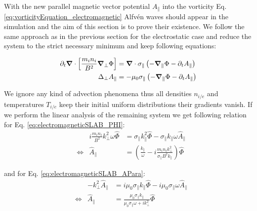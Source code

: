 With the new parallel magnetic vector potential $A_\parallel$ into the vorticity Eq. \ref{eq:vorticityEquation_electromagnetic} Alfvén waves should appear in the simulation and the aim of this section is to prove their existence. We follow the same approach as in the previous section for the electrostatic case and reduce the system to the strict necessary minimum and keep following equations: 

\begin{align}
	\partial_t\grad\cdot\left[\frac{m_in_i}{B^2}\grad_\perp\Phi\right] &= \grad\cdot\sigma_\parallel\left(-\grad_\parallel\Phi-\partial_tA_\parallel\right) \label{eq:electromagneticSLAB_PHI} \\
	\Delta_{\perp}A_\parallel &= -\mu_0\sigma_\parallel\left(-\grad_\parallel\Phi-\partial_tA_\parallel\right) \label{eq:electromagneticSLAB_APara}
\end{align}

We ignore any kind of advection phenomena thus all densities $n_{i/e}$ and temperatures $T_{i/e}$ keep their initial uniform distributions their gradients vanish. If we perform the linear analysis of the remaining system we get following relation for Eq. \ref{eq:electromagneticSLAB_PHI}:
\begin{align*}
	&&i\frac{m_in_i}{B^2}k_\perp^2\omega\hat{\Phi} &= \sigma_\parallel k_\parallel^2\hat{\Phi}-\sigma_\parallel k_\parallel\omega\hat{A}_\parallel \\
	&\Leftrightarrow& \hat{A}_\parallel &= \left(\frac{k_\parallel}{\omega} - i\frac{m_in_ik_\perp^2}{\sigma_\parallel B^2k_\parallel}\right)\hat{\Phi}
\end{align*}

and for Eq. \ref{eq:electromagneticSLAB_APara}:
\begin{align*}
	&&-k_\perp^2\hat{A}_\parallel &= i\mu_0\sigma_\parallel k_\parallel\hat{\Phi} - i\mu_0\sigma_\parallel\omega\hat{A}_\parallel \\
	&\Leftrightarrow&\hat{A}_\parallel &= \frac{\mu_0\sigma_\parallel k_\parallel}{\mu_0\sigma_\parallel\omega + i k_\perp^2}\hat{\Phi}
\end{align*}

